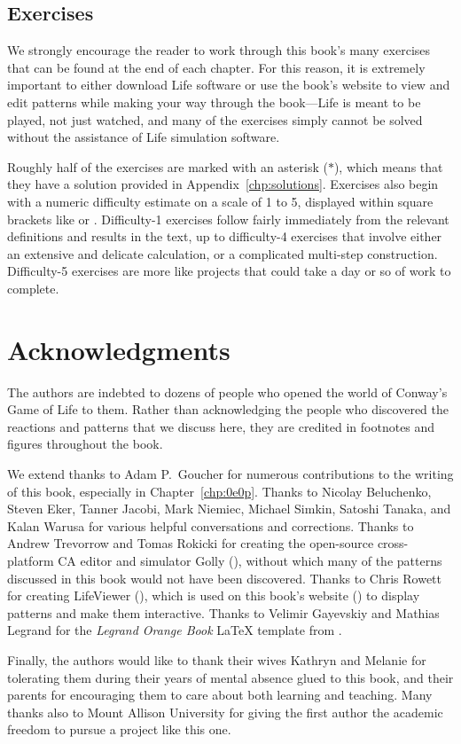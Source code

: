 \subsection*{Exercises}

We strongly encourage the reader to work through this book's many exercises that can be found at the end of each chapter. For this reason, it is extremely important to either download Life software or use the book's website to view and edit patterns while making your way through the book---Life is meant to be played, not just watched, and many of the exercises simply cannot be solved without the assistance of Life simulation software.

Roughly half of the exercises are marked with an asterisk ($\ast$), which means that they have a solution provided in Appendix~\ref{chp:solutions}. Exercises also begin with a numeric difficulty estimate on a scale of 1 to 5, displayed within square brackets like  or . Difficulty-1 exercises follow fairly immediately from the relevant definitions and results in the text, up to difficulty-4 exercises that involve either an extensive and delicate calculation, or a complicated multi-step construction. Difficulty-5 exercises are more like projects that could take a day or so of work to complete.


\section*{Acknowledgments}

The authors are indebted to dozens of people who opened the world of Conway's Game of Life to them. Rather than acknowledging the people who discovered the reactions and patterns that we discuss here, they are credited in footnotes and figures throughout the book.

We extend thanks to Adam P.~Goucher for numerous contributions to the writing of this book, especially in Chapter~\ref{chp:0e0p}. Thanks to Nicolay Beluchenko, Steven Eker, Tanner Jacobi, Mark Niemiec, Michael Simkin, Satoshi Tanaka, and Kalan Warusa for various helpful conversations and corrections. Thanks to Andrew Trevorrow and Tomas Rokicki for creating the open-source cross-platform CA editor and simulator Golly (), without which many of the patterns discussed in this book would not have been discovered. Thanks to Chris Rowett for creating LifeViewer (), which is used on this book's website () to display patterns and make them interactive. Thanks to Velimir Gayevskiy and Mathias Legrand for the \emph{Legrand Orange Book} LaTeX template from .

Finally, the authors would like to thank their wives Kathryn and Melanie for tolerating them during their years of mental absence glued to this book, and their parents for encouraging them to care about both learning and teaching. Many thanks also to Mount Allison University for giving the first author the academic freedom to pursue a project like this one.
